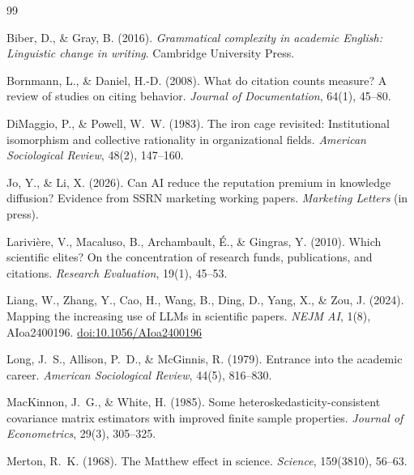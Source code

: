 \documentclass[12pt,a4paper]{article}
\newcommand{\doi}[1]{\href{https://doi.org/#1}{doi:#1}}
\begin{document}

\begin{thebibliography}{99}

Biber, D., \& Gray, B. (2016).
\newblock \textit{Grammatical complexity in academic English: Linguistic change
  in writing}.
\newblock Cambridge University Press.

Bornmann, L., \& Daniel, H.-D. (2008).
\newblock What do citation counts measure? A review of studies on citing
  behavior.
\newblock \textit{Journal of Documentation}, 64(1), 45--80.

DiMaggio, P., \& Powell, W.~W. (1983).
\newblock The iron cage revisited: Institutional isomorphism and collective
  rationality in organizational fields.
\newblock \textit{American Sociological Review}, 48(2), 147--160.

Jo, Y., \& Li, X. (2026).
\newblock Can AI reduce the reputation premium in knowledge diffusion?
  Evidence from SSRN marketing working papers.
\newblock \textit{Marketing Letters} (in press).

Larivi\`{e}re, V., Macaluso, B., Archambault, \'{E}., \& Gingras, Y. (2010).
\newblock Which scientific elites? On the concentration of research funds,
  publications, and citations.
\newblock \textit{Research Evaluation}, 19(1), 45--53.

Liang, W., Zhang, Y., Cao, H., Wang, B., Ding, D., Yang, X.,
  \& Zou, J. (2024).
\newblock Mapping the increasing use of LLMs in scientific papers.
\newblock \textit{NEJM AI}, 1(8), AIoa2400196.
\newblock \doi{10.1056/AIoa2400196}

Long, J.~S., Allison, P.~D., \& McGinnis, R. (1979).
\newblock Entrance into the academic career.
\newblock \textit{American Sociological Review}, 44(5), 816--830.

MacKinnon, J.~G., \& White, H. (1985).
\newblock Some heteroskedasticity-consistent covariance matrix estimators with
  improved finite sample properties.
\newblock \textit{Journal of Econometrics}, 29(3), 305--325.

Merton, R.~K. (1968).
\newblock The Matthew effect in science.
\newblock \textit{Science}, 159(3810), 56--63.


\end{thebibliography}
\end{document}
